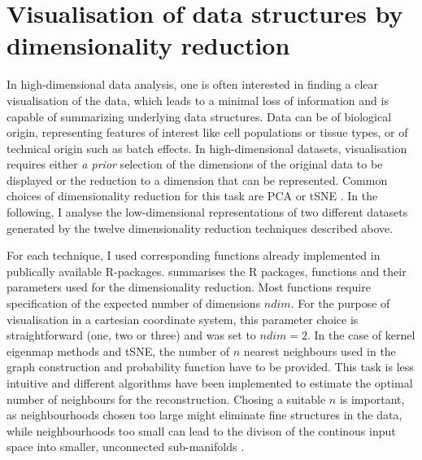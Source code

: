 \section{Visualisation of data structures by dimensionality reduction}
\label{section:visualisation}
In high-dimensional data analysis, one is often interested in finding a clear visualisation of the data, which leads to a minimal loss of information and is capable of summarizing underlying data structures. Data can be of biological origin, representing features of interest like cell populations or tissue types, or of technical origin such as batch effects. In high-dimensional datasets, visualisation requires either \textit{a prior} selection of the dimensions of the original data to be displayed or the reduction to a dimension that can be represented. Common choices of dimensionality reduction for this task are PCA or tSNE \citep{Deng2014,Crowley2015,Corces2016,Martinez-Jimenez2017,Huisman2017}. In the following, I analyse the low-dimensional representations of two different datasets generated by the twelve dimensionality reduction techniques described above.

For each technique, I used corresponding functions already implemented in publically available R-packages.  summarises the R packages, functions and their parameters used for the dimensionality reduction. Most functions require specification of the expected number of dimensions \(ndim\). For the purpose of visualisation in a cartesian coordinate system, this parameter choice is straightforward (one, two or three) and was set to  \(ndim=2\). In the case of kernel eigenmap methods and tSNE, the number of \(n\) nearest neighbours used in the graph construction and probability function have to be provided. This task is less intuitive and different algorithms have been implemented to estimate the optimal number of neighbours for the reconstruction. Chosing a suitable \(n\) is important, as neighbourhoods chosen too large might eliminate fine structures in the data, while neighbourhoods too small can lead to the divison of the continous input space into smaller, unconnected sub-manifolds \citep{Kayo2006}.

